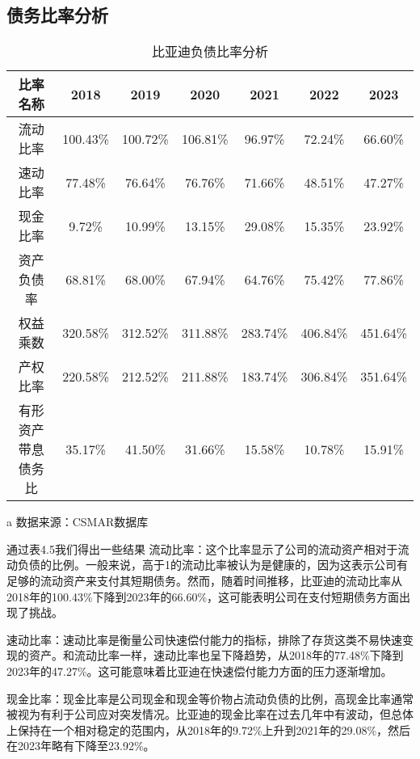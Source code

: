 \subsection{债务比率分析}
\begin{table}
  \centering
  \begin{threeparttable}[c]
    \caption{比亚迪负债比率分析}
    \label{tab:debt-rates}
    \begin{tabular}{ccccccc}
      \toprule
        比率名称 & 2018 & 2019 & 2020 & 2021 & 2022 & 2023 \\ 
      \midrule
        流动比率 & 100.43\% & 100.72\% & 106.81\% & 96.97\% & 72.24\% & 66.60\% \\ 
        速动比率 & 77.48\% & 76.64\% & 76.76\% & 71.66\% & 48.51\% & 47.27\% \\ 
        现金比率 & 9.72\% & 10.99\% & 13.15\% & 29.08\% & 15.35\% & 23.92\% \\ 
        资产负债率 & 68.81\% & 68.00\% & 67.94\% & 64.76\% & 75.42\% & 77.86\% \\
        权益乘数 & 320.58\% & 312.52\% & 311.88\% & 283.74\% & 406.84\% & 451.64\% \\ 
        产权比率 & 220.58\% & 212.52\% & 211.88\% & 183.74\% & 306.84\% & 351.64\% \\ 
        有形资产带息债务比 & 35.17\% & 41.50\% & 31.66\% & 15.58\% & 10.78\% & 15.91\% \\ 
      \bottomrule
    \end{tabular}
    \begin{tablenotes}
      \item [a] 数据来源：CSMAR数据库
    \end{tablenotes}
  \end{threeparttable}
\end{table}
通过表4.5我们得出一些结果
流动比率：这个比率显示了公司的流动资产相对于流动负债的比例。一般来说，高于1的流动比率被认为是健康的，因为这表示公司有足够的流动资产来支付其短期债务。然而，随着时间推移，比亚迪的流动比率从2018年的100.43\%下降到2023年的66.60\%，这可能表明公司在支付短期债务方面出现了挑战。

速动比率：速动比率是衡量公司快速偿付能力的指标，排除了存货这类不易快速变现的资产。和流动比率一样，速动比率也呈下降趋势，从2018年的77.48\%下降到2023年的47.27\%。这可能意味着比亚迪在快速偿付能力方面的压力逐渐增加。

现金比率：现金比率是公司现金和现金等价物占流动负债的比例，高现金比率通常被视为有利于公司应对突发情况。比亚迪的现金比率在过去几年中有波动，但总体上保持在一个相对稳定的范围内，从2018年的9.72\%上升到2021年的29.08\%，然后在2023年略有下降至23.92\%。

